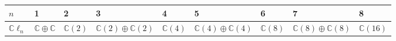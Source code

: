 \documentclass[11pt,a4paper]{ctexart}
\begin{document}
{\def\LTcaptype{table} %
\begin{longtable}[]{@{}
  >{\raggedright\arraybackslash}p{}
  >{\raggedright\arraybackslash}p{}
  >{\raggedright\arraybackslash}p{}
  >{\raggedright\arraybackslash}p{}
  >{\raggedright\arraybackslash}p{}
  >{\raggedright\arraybackslash}p{}
  >{\raggedright\arraybackslash}p{}
  >{\raggedright\arraybackslash}p{}
  >{\raggedright\arraybackslash}p{}@{}}
\toprule\noalign{}
\begin{minipage}[b]{\linewidth}\raggedright
\(n\)
\end{minipage} & \begin{minipage}[b]{\linewidth}\raggedright
1
\end{minipage} & \begin{minipage}[b]{\linewidth}\raggedright
2
\end{minipage} & \begin{minipage}[b]{\linewidth}\raggedright
3
\end{minipage} & \begin{minipage}[b]{\linewidth}\raggedright
4
\end{minipage} & \begin{minipage}[b]{\linewidth}\raggedright
5
\end{minipage} & \begin{minipage}[b]{\linewidth}\raggedright
6
\end{minipage} & \begin{minipage}[b]{\linewidth}\raggedright
7
\end{minipage} & \begin{minipage}[b]{\linewidth}\raggedright
8
\end{minipage} \\
\midrule\noalign{}
\endhead
\bottomrule\noalign{}
\endlastfoot
\({\mathbb{C}}\ell_n\) & \({\mathbb{C}}\oplus{\mathbb{C}}\) & \({\mathbb{C}}(2)\) & \({\mathbb{C}}(2)\oplus{\mathbb{C}}(2)\) & \({\mathbb{C}}(4)\) & \({\mathbb{C}}(4)\oplus{\mathbb{C}}(4)\) & \({\mathbb{C}}(8)\) & \({\mathbb{C}}(8)\oplus{\mathbb{C}}(8)\) & \({\mathbb{C}}(16)\) \\
\end{longtable}
}
\end{document}
